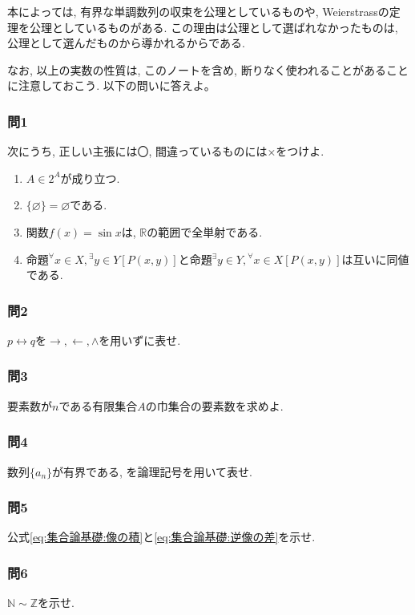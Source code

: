         本によっては, 有界な単調数列の収束を公理としているものや, Weierstrassの定理を公理としているものがある. この理由は公理として選ばれなかったものは, 公理として選んだものから導かれるからである.

        なお, 以上の実数の性質は, このノートを含め, 断りなく使われることがあることに注意しておこう.
\clearpage
    \basicquestion 以下の問いに答えよ。

        \subsubsection*{問1} 次にうち, 正しい主張には〇, 間違っているものには×をつけよ.
            \begin{enumerate}
                \item $A\in 2^A$が成り立つ.
                \item $\{\varnothing\}=\varnothing$である.
                \item 関数$f(x)=\sin x$は, $\mathbb{R}$の範囲で全単射である.
                \item 命題$^\forall x\in X,{}^\exists y\in Y\left[P(x,y)\right]$と命題$^\exists y\in Y,{}^\forall x\in X\left[P(x,y)\right]$は互いに同値である.
            \end{enumerate}

        \subsubsection*{問2} $p\leftrightarrow q$を$\rightarrow,\leftarrow,\land$を用いずに表せ.

        \subsubsection*{問3}要素数が$n$である有限集合$A$の巾集合の要素数を求めよ.
        
        \subsubsection*{問4}数列$\{a_n\}$が有界である, を論理記号を用いて表せ.

        \subsubsection*{問5}公式\eqref{eq:集合論基礎:像の積}と\eqref{eq:集合論基礎:逆像の差}を示せ.

        \subsubsection*{問6}$\mathbb{N}\sim\mathbb{Z}$を示せ.

